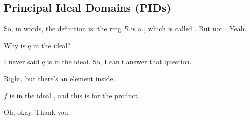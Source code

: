 \begin{hidden}
\end{hidden}

\subsection{Principal Ideal Domains (PIDs)}

\begin{speech}[00:36:59 - 00:37:20]
So, in words, the definition is: the ring $R$ is a , which is called  . But not . Yeah.
\end{speech}

\begin{student}
Why is $q$ in the ideal?
\end{student}

\begin{speech}[00:37:24 - 00:37:30]
I never said $q$ is in the ideal. So, I can't answer that question.
\end{speech}

\begin{student}
Right, but there's an element inside...
\end{student}

\begin{speech}[00:37:34 - 00:37:39]
$f$ is in the ideal , and this is for the product .
\end{speech}

\begin{student}
Oh, okay. Thank you.
\end{student}

